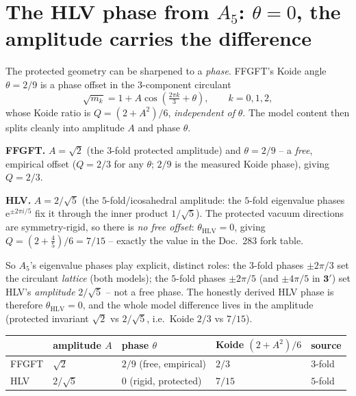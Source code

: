 \section{The HLV phase from $A_5$: $\theta=0$, the amplitude carries the difference}
The protected geometry can be sharpened to a \emph{phase}. FFGFT's Koide angle $\theta=2/9$
is a phase offset in the $3$-component circulant
\begin{equation}
\sqrt{m_k} = 1 + A\cos\!\left(\tfrac{2\pi k}{3}+\theta\right),\qquad k=0,1,2,
\end{equation}
whose Koide ratio is $Q=(2+A^2)/6$, \emph{independent of} $\theta$. The model content then
splits cleanly into amplitude $A$ and phase $\theta$.

\textbf{FFGFT.} $A=\sqrt2$ (the $3$-fold protected amplitude) and $\theta=2/9$ -- a
\emph{free}, empirical offset ($Q=2/3$ for any $\theta$; $2/9$ is the measured Koide phase),
giving $Q=2/3$.

\textbf{HLV.} $A=2/\sqrt5$ (the $5$-fold/icosahedral amplitude: the $5$-fold eigenvalue
phases $\mathrm e^{\pm2\pi i/5}$ fix it through the inner product $1/\sqrt5$). The protected
vacuum directions are symmetry-rigid, so there is \emph{no free offset}:
$\theta_{\mathrm{HLV}}=0$, giving $Q=(2+\tfrac45)/6=7/15$ -- exactly the value in the
Doc.~283 fork table.

So $A_5$'s eigenvalue phases play explicit, distinct roles: the $3$-fold phases $\pm2\pi/3$
set the circulant \emph{lattice} (both models); the $5$-fold phases $\pm2\pi/5$ (and
$\pm4\pi/5$ in $\mathbf 3'$) set HLV's \emph{amplitude} $2/\sqrt5$ -- not a free phase. The
honestly derived HLV phase is therefore $\theta_{\mathrm{HLV}}=0$, and the whole model
difference lives in the amplitude (protected invariant $\sqrt2$ vs $2/\sqrt5$, i.e.\ Koide
$2/3$ vs $7/15$).

\begin{center}\small
\renewcommand{\arraystretch}{1.2}
\begin{tabular}{@{}p{1.8cm} p{1.7cm} p{3.4cm} p{2.4cm} p{1.6cm}@{}}
\toprule
 & amplitude $A$ & phase $\theta$ & Koide $(2{+}A^2)/6$ & source \\
\midrule
FFGFT & $\sqrt2$ & $2/9$ (free, empirical) & $2/3$ & $3$-fold \\
HLV & $2/\sqrt5$ & $0$ (rigid, protected) & $7/15$ & $5$-fold \\
\bottomrule
\end{tabular}
\end{center}

